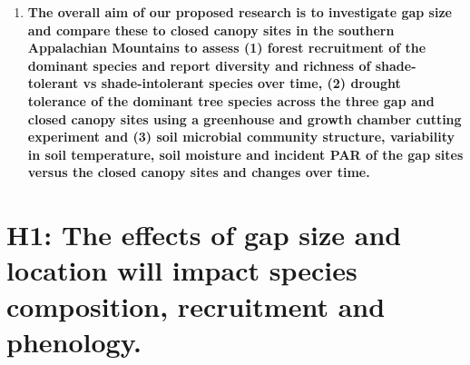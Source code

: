 \documentclass{article}\usepackage[]{graphicx}\usepackage[]{color}
\begin{document}
\begin{enumerate}
\item \textbf{The overall aim of our proposed research is to investigate gap size and compare these to closed canopy sites in the southern Appalachian Mountains to assess (1) forest recruitment of the dominant species and report diversity and richness of shade-tolerant vs shade-intolerant species over time, (2) drought tolerance of the dominant tree species across the three gap and closed canopy sites using a greenhouse and growth chamber cutting experiment and (3) soil microbial community structure, variability in soil temperature, soil moisture and incident PAR of the gap sites versus the closed canopy sites and changes over time.}
  
\end{enumerate}

\section*{\textbf{H1: The effects of gap size and location will impact species composition, recruitment and phenology.  }}
\end{document}
